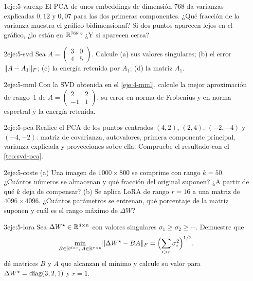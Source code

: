 \begin{ejercicio}{1}{eje:5-varexp}
El PCA de unos embeddings de dimensión 768 da varianzas explicadas $0{,}12$ y $0{,}07$ para las dos primeras componentes. ¿Qué fracción de la varianza muestra el gráfico bidimensional? Si dos puntos aparecen lejos en el gráfico, ¿lo están en $\mathbb{R}^{768}$? ¿Y si aparecen cerca?
\end{ejercicio}

\begin{ejercicio}{2}{eje:5-svd}
Sea $A=\begin{pmatrix}3&0\\4&5\end{pmatrix}$. Calcule (a) sus valores singulares; (b) el error $\lVert A-A_1\rVert_F$; (c) la energía retenida por $A_1$; (d) la matriz $A_1$.
\end{ejercicio}

\begin{ejercicio}{2}{eje:5-mml}
Con la SVD obtenida en el \cref{eje:4-mml}, calcule la mejor aproximación de rango~1 de $A=\begin{pmatrix}2&2\\-1&1\end{pmatrix}$, su error en norma de Frobenius y en norma espectral y la energía retenida.
\end{ejercicio}

\begin{ejercicio}{2}{eje:5-pca}
Realice el PCA de los puntos centrados $(4,2)$, $(2,4)$, $(-2,-4)$ y $(-4,-2)$: matriz de covarianza, autovalores, primera componente principal, varianza explicada y proyecciones sobre ella. Compruebe el resultado con el \cref{teo:svd-pca}.
\end{ejercicio}

\begin{ejercicio}{2}{eje:5-coste}
(a) Una imagen de $1000\times 800$ se comprime con rango $k=50$. ¿Cuántos números se almacenan y qué fracción del original suponen? ¿A partir de qué $k$ deja de compensar? (b) Se aplica LoRA de rango $r=16$ a una matriz de $4096\times 4096$. ¿Cuántos parámetros se entrenan, qué porcentaje de la matriz suponen y cuál es el rango máximo de $\Delta W$?
\end{ejercicio}

\begin{ejercicio}{3}{eje:5-lora}
Sea $\Delta W^{\star}\in\mathbb{R}^{d\times n}$ con valores singulares $\sigma_1\ge\sigma_2\ge\cdots$. Demuestre que
\[
\min_{B\in\mathbb{R}^{d\times r},\,A\in\mathbb{R}^{r\times n}}\lVert\Delta W^{\star}-BA\rVert_F=\Bigl(\sum_{i>r}\sigma_i^{2}\Bigr)^{1/2},
\]
dé matrices $B$ y $A$ que alcanzan el mínimo y calcule su valor para $\Delta W^{\star}=\operatorname{diag}(3,2,1)$ y $r=1$.
\end{ejercicio}

